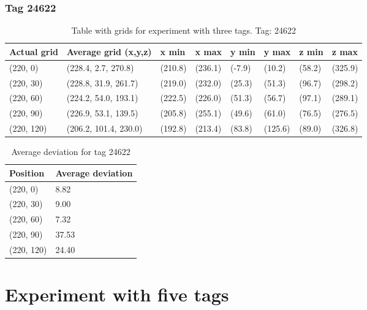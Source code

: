 \subsubsection{Tag 24622}
\begin{table}[H] 
    \centering
    \begin{tabular}{|l|l|l|l|l|l|l|l|}
        \hline
        Actual grid & Average grid (x,y,z)       & x min          & x max    & y min    & y max   & z min   & z max    \\ \hline
        (220, 0)     & (228.4, 2.7, 270.8)      & (210.8)     & (236.1)    & (-7.9)     & (10.2)      & (58.2)     & (325.9)    \\ \hline
        (220, 30)     & (228.8, 31.9, 261.7)      & (219.0)     & (232.0)    & (25.3)     & (51.3)      & (96.7)     & (298.2)    \\ \hline
        (220, 60)     & (224.2, 54.0, 193.1)      & (222.5)     & (226.0)    & (51.3)     & (56.7)      & (97.1)     & (289.1)    \\ \hline
        (220, 90)     & (226.9, 53.1, 139.5)      & (205.8)     & (255.1)    & (49.6)     & (61.0)      & (76.5)     & (276.5)    \\ \hline
        (220, 120)     & (206.2, 101.4, 230.0)      & (192.8)     & (213.4)    & (83.8)     & (125.6)      & (89.0)     & (326.8)    \\ \hline
    \end{tabular}
    \caption{Table with grids for experiment with three tags. Tag: 24622}
    \label{Tab:three-tag-experiment-result-tag-24622}
\end{table}

\begin{table}[]
    \centering
    \begin{tabular}{|l|l|}
    \hline
    Position   & Average deviation \\ \hline
    (220, 0)   & 8.82              \\ \hline
    (220, 30)  & 9.00              \\ \hline
    (220, 60)  & 7.32              \\ \hline
    (220, 90)  & 37.53             \\ \hline
    (220, 120) & 24.40             \\ \hline
    \end{tabular}
\caption{Average deviation for tag 24622}
\end{table}

\section{Experiment with five tags}

